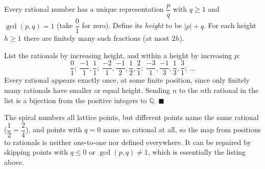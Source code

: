 Every rational number has a unique representation $\dfrac pq$ with $q\ge1$ and $\gcd(p,q)=1$ (take $\dfrac01$ for zero). Define its \emph{height} to be $|p|+q$. For each height $h\ge1$ there are finitely many such fractions (at most $2h$).

List the rationals by increasing height, and within a height by increasing $p$:
\[\dfrac01;\ \dfrac{-1}1,\dfrac11;\ \dfrac{-2}1,\dfrac{-1}2,\dfrac12,\dfrac21;\ \dfrac{-3}1,\dfrac{-1}3,\dfrac13,\dfrac31;\ \ldots\]
Every rational appears exactly once, at some finite position, since only finitely many rationals have smaller or equal height. Sending $n$ to the $n$th rational in the list is a bijection from the positive integers to $\mathbb Q$. $\blacksquare$

The spiral numbers all lattice points, but different points name the same rational ($\dfrac12=\dfrac24$), and points with $q=0$ name no rational at all, so the map from positions to rationals is neither one-to-one nor defined everywhere. It can be repaired by skipping points with $q\le0$ or $\gcd(p,q)\ne1$, which is essentially the listing above.
